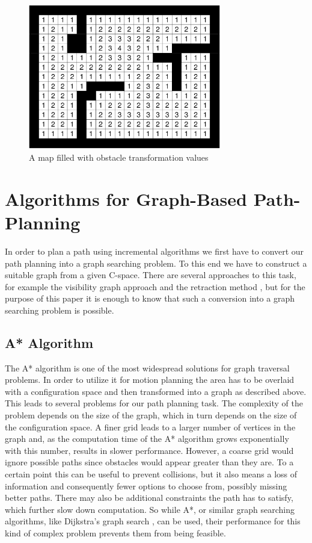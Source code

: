 \begin{figure}[b]
\centering
\includegraphics[width=0.75\textwidth]{./Chapters/Figures/obstacle_transformation.png}
\caption{A map filled with obstacle transformation values\label{pic:obstacle_transformation}}
\end{figure}

\section{Algorithms for Graph-Based Path-Planning}
\label{sec:graphbased_pathplanning}

In order to plan a path using incremental algorithms we first have to convert our path planning into a graph searching problem. To this end we have to construct a suitable graph from a given C-space. There are several approaches to this task, for example the visibility graph approach \cite{2,3} and the retraction method \cite{4,5}, but for the purpose of this paper it is enough to know that such a conversion into a graph searching problem is possible. 

\subsection{A* Algorithm}
\label{sec:a_star}

The A* algorithm is one of the most widespread solutions for graph traversal problems.\cite{8} In order to utilize it for motion planning the area has to be overlaid with a configuration space and then transformed into a graph as described above. This leads to several problems for our path planning task. The complexity of the problem depends on the size of the graph, which in turn depends on the size of the configuration space. A finer grid leads to a larger number of vertices in the graph and, as the computation time of the A* algorithm grows exponentially with this number, results in slower performance. However, a coarse grid would ignore possible paths since obstacles would appear greater than they are. To a certain point this can be useful to prevent collisions, but it also means a loss of information and consequently fewer options to choose from, possibly missing better paths. There may also be additional constraints the path has to satisfy, which further slow down computation. So while A*, or similar graph searching algorithms, like Dijkstra's graph search \cite{6}, can be used, their performance for this kind of complex problem prevents them from being feasible.

